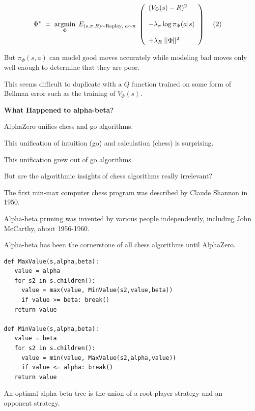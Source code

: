 {$$\Phi^*\; = \;\operatorname*{argmin}_\Phi \;E_{(s,\pi,R) \sim \mathrm{Replay},\;a \sim \pi}\;\left(\begin{array}{l} (V_\Phi(s) - R)^2 \\ \\ - \lambda_\pi\log \pi_\Phi(a|s) \\ \\ + \lambda_R\;||\Phi||^2\end{array}\right)\;\;\;\;(2)$$

\vfill
But $\pi_\Phi(s,a)$ can model good moves accurately while modeling bad moves only well enough to determine that they are poor.

\vfill
This seems difficult to duplicate with a $Q$ function
trained on some form of Bellman error such as the training of $V_\Phi(s)$.


\slide{}
\centerline{\bf What Happened to alpha-beta?}
\vfill


AlphaZero unifies chess and go algorithms.

\vfill
This unification of intuition (go) and calculation (chess) is surprising.

\vfill
This unification grew out of go algorithms.

\vfill
But are the algorithmic insights of chess algorithms really irrelevant?


The first min-max computer chess program was described by Claude Shannon in 1950.

\vfill
Alpha-beta pruning was invented by various people independently, including John McCarthy, about 1956-1960.

\vfill
Alpha-beta has been the cornerstone of all chess algorithms until AlphaZero.



\begin{verbatim}
def MaxValue(s,alpha,beta):
   value = alpha
   for s2 in s.children():
     value = max(value, MinValue(s2,value,beta))
     if value >= beta: break()
   return value

def MinValue(s,alpha,beta):
   value = beta
   for s2 in s.children():
     value = min(value, MaxValue(s2,alpha,value))
     if value <= alpha: break()
   return value
\end{verbatim}



An optimal alpha-beta tree is the union of a root-player strategy and an opponent strategy.

}
